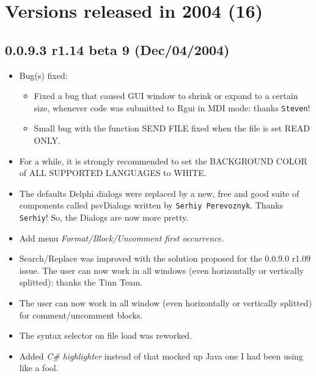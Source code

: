 
\hypertarget{2004}{}
\section{Versions released in 2004 (16)}
\subsection*{0.0.9.3 r1.14 beta 9 (Dec/04/2004)}
\begin{itemize}
  \item Bug(s) fixed:
    \begin{itemize}
      \item Fixed a bug that caused \RR{} GUI window to shrink or expand to a certain size,
        whenever code was submitted to Rgui in MDI mode: thanks \texttt{Steven}!
      \item Small bug with the function SEND FILE fixed when the file is set READ ONLY.
    \end{itemize}
  \item For a while, it is strongly recommended to set the BACKGROUND COLOR of ALL SUPPORTED LANGUAGES to WHITE.
  \item The defaults Delphi dialogs were replaced by a new, free and good suite of components called psvDialogs
    written by \texttt{Serhiy Perevoznyk}. Thanks \texttt{Serhiy}! So, the Dialogs are now more pretty.
  \item Add menu \textit{Format/Block/Uncomment first occurrence}.
  \item Search/Replace was improved with the solution proposed for the 0.0.9.0 r1.09 issue. The user can now work
    in all windows (even horizontally or vertically splitted): thanks the Tinn Team.
  \item The user can now work in all window (even horizontally or vertically splitted) for comment/uncomment blocks.
  \item The syntax selector on file load was reworked.
  \item Added \textit{C\# highlighter} instead of that mocked up Java one I had been using like a fool.
\end{itemize}


